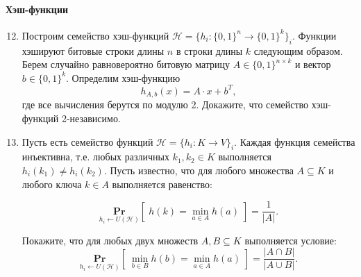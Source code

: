 \documentclass{article}
\newcommand{\ProbSimple}[1]{\mathbf{#1}}
\newcommand{\ProbSign}[3]{\underset{#2}{\ProbSimple{#1}}\left[\;#3\;\right]}
\renewcommand{\Pr}[2]{\ProbSign{Pr}{#1}{#2}}
\begin{document}
\paragraph{Хэш-функции}
\begin{enumerate}
    \setcounter{enumi}{11}

    \item Построим семейство хэш-функций $\mathcal{H} = \{h_i : \{0, 1\}^n \rightarrow \{0, 1\}^k\}_i$. 
    Функции хэшируют битовые строки длины $n$ в строки длины $k$ следующим образом. Берем случайно равновероятно битовую матрицу $A \in \{0, 1\}^{n \times k}$ и вектор $b \in \{0, 1\}^k$. Определим хэш-функцию 
    $$
    h_{A, b}(x) = A \cdot x + b^T,
    $$
    где все вычисления берутся по модулю 2. Докажите, что семейство хэш-функций 2-независимо.

    \item Пусть есть семейство функций $\mathcal{H} = \{h_i : K \rightarrow V\}_i$. Каждая функция семейства инъективна, т.е. любых различных $k_1, k_2 \in K$ выполняется $h_i(k_1) \neq h_i(k_2)$.
    Пусть известно, что для любого множества $A \subseteq K$ и любого ключа $k \in A$ выполняется равенство:

    $$
        \Pr{h_i \leftarrow U(\mathcal{H})}{h(k) = \min_{a \in A} h(a)} = \frac{1}{|A|}.
    $$

    Покажите, что для любых двух множеств $A, B \subseteq K$ выполняется условие:
    $$
        \Pr{h_i \leftarrow U(\mathcal{H})}{\min_{b \in B} h(b) = \min_{a \in A} h(a)} = \frac{|A \cap B|}{|A \cup B|}.
    $$
        
\end{enumerate}
\end{document}
